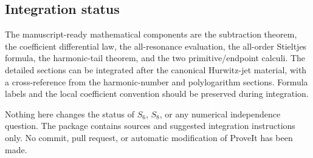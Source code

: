 \subsection{Integration status}
The manuscript-ready mathematical components are the subtraction theorem,
the coefficient differential law, the all-resonance evaluation, the
all-order Stieltjes formula, the harmonic-tail theorem, and the two
primitive/endpoint calculi.  The detailed sections can be integrated after
the canonical Hurwitz-jet material, with a cross-reference from the
harmonic-number and polylogarithm sections.  Formula labels and the local
coefficient convention should be preserved during integration.

Nothing here changes the status of $S_6$, $S_8$, or any numerical
independence question.  The package contains sources and suggested
integration instructions only.  No commit, pull request, or automatic
modification of ProveIt has been made.
